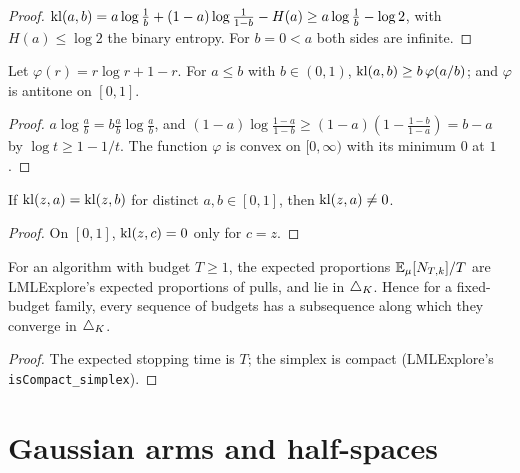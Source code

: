 \begin{proof}
  \leanok
  $\mathrm{kl}(a, b) = a \log\frac1b + (1 - a) \log\frac1{1 - b} - H(a) \ge a \log\frac1b - \log 2$, with
  $H(a) \le \log 2$ the binary entropy. For $b = 0 < a$ both sides are infinite.
\end{proof}

\begin{lemma}
  \label{lem:klBer_ge_klFun}
  \leanok
  Let $\varphi(r) = r \log r + 1 - r$. For $a \le b$ with $b \in (0, 1)$,
  $\mathrm{kl}(a, b) \ge b \, \varphi(a / b)$; and $\varphi$ is antitone on $[0, 1]$.
\end{lemma}

\begin{proof}
  \leanok
  $a \log \frac ab = b \frac ab \log \frac ab$, and $(1 - a) \log \frac{1 - a}{1 - b} \ge (1 - a)(1 -
  \frac{1 - b}{1 - a}) = b - a$ by $\log t \ge 1 - 1/t$. The function $\varphi$ is convex on $[0,
  \infty)$ with its minimum $0$ at $1$.
\end{proof}

\begin{lemma}
  \label{lem:klBer_ne_zero_of_eq}
  \leanok
  If $\mathrm{kl}(z, a) = \mathrm{kl}(z, b)$ for distinct $a, b \in [0, 1]$, then $\mathrm{kl}(z, a) \ne 0$.
\end{lemma}

\begin{proof}
  \leanok
  On $[0, 1]$, $\mathrm{kl}(z, c) = 0$ only for $c = z$.
\end{proof}

\begin{lemma}
  \label{lem:tendsto_subseq_proportions}
  \leanok
  For an algorithm with budget $T \ge 1$, the expected proportions $\mathbb{E}_{\mu}[N_{T,k}] / T$ are
  LMLExplore's expected proportions of pulls, and lie in $\triangle_K$. Hence for a fixed-budget
  family, every sequence of budgets has a subsequence along which they converge in $\triangle_K$.
\end{lemma}

\begin{proof}
  \leanok
  The expected stopping time is $T$; the simplex is compact (LMLExplore's
  \texttt{isCompact\_simplex}).
\end{proof}

\section{Gaussian arms and half-spaces}

